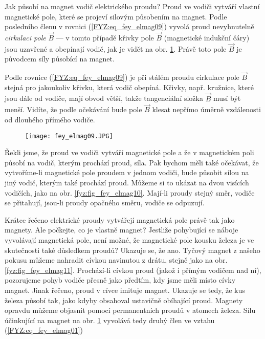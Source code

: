     Jak působí na magnet vodič elektrického proudu? Proud ve vodiči vytváří vlastní magnetické pole, které 
    se projeví silovým působením na magnet. Podle posledního členu v rovnici (\ref{FYZ:eq_fey_elmag09}) 
    vyvolá proud nevyhnutelně \emph{cirkulaci pole} \(\vec{B}\) — v tomto případě křivky pole \(\vec{B}\) 
    (magnetické indukční čáry) jsou uzavřené a obepínají vodič, jak je vidět na obr.    
    \ref{fyz:fig_fey_elmag09}. Právě toto pole \(\vec{B}\) je původcem síly působící na magnet.  
    
    Podle rovnice (\ref{FYZ:eq_fey_elmag09}) je při stálém proudu cirkulace pole \(\vec{B}\) stejná pro 
    jakoukoliv křivku, která vodič obepíná. Křivky, např. kružnice, které jsou dále od vodiče, mají obvod 
    větší, takže tangenciální složka \(\vec{B}\) musí být menší. Vidíte, že podle očekávání bude pole 
    \(\vec{B}\) klesat nepřímo úměrně vzdálenosti od dlouhého přímého vodiče.     

    \begin{figure}   
      \texttt{[image: fey\_elmag09.JPG]}
      \label{fyz:fig_fey_elmag09}   
    \end{figure}                             
    
    Řekli jsme, že proud ve vodiči vytváří magnetické pole a že v magnetickém poli působí na vodič, kterým 
    prochází proud, síla. Pak bychom měli také očekávat, že vytvoříme-li magnetické pole proudem v jednom 
    vodiči, bude působit silou na jiný vodič, kterým také prochází proud. Můžeme si to ukázat na dvou 
    visících vodičích, jako na obr. \ref{fyz:fig_fey_elmag10}. Mají-li proudy stejný směr, vodiče se 
    přitahují, jsou-li proudy opačného směru, vodiče se odpuzují.
    
    Krátce řečeno elektrické proudy vytvářejí magnetická pole právě tak jako magnety. Ale počkejte, co je 
    vlastně magnet? Jestliže pohybující se náboje vyvolávají magnetická pole, není možné, že magnetické 
    pole kousku železa je ve skutečnosti také důsledkem proudů? Ukazuje se, že ano. Tyčový magnet z našeho 
    pokusu můžeme nahradit cívkou navinutou z drátu, stejně jako na obr. \ref{fyz:fig_fey_elmag11}. 
    Prochází-li cívkou proud (jakož i přímým vodičem nad ní), pozorujeme pohyb vodiče přesně jako předtím, 
    kdy jsme měli místo cívky magnet. Jinak řečeno, proud v cívce imituje magnet. Ukazuje se tedy, že kus 
    železa působí tak, jako kdyby obsahoval ustavičně obíhající proud. Magnety opravdu můžeme objasnit 
    pomocí permanentních proudů v atomech železa. Sílu účinkující na magnet na obr. 
    \ref{fyz:fig_fey_elmag09} vyvolává tedy druhý člen ve vztahu (\ref{FYZ:eq_fey_elmag01})         

